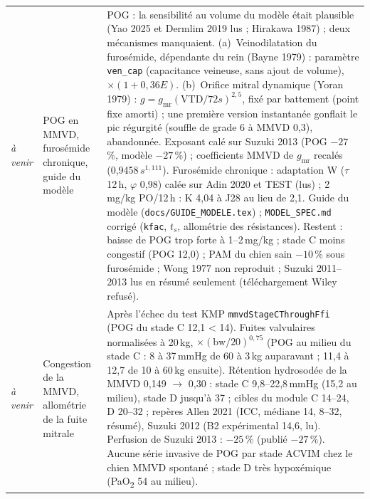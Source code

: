 \documentclass[11pt,a4paper]{article}
\newcommand{\ecart}[1]{\textcolor{red!60!black}{#1}}
\begin{document}
\begin{longtable}{@{}p{1.5cm}p{4.2cm}p{10.3cm}@{}}
\textit{à venir} & POG en MMVD, furosémide chronique, guide du modèle & POG : la sensibilité au volume du modèle était plausible (Yao 2025 et Dermlim 2019 lus ; Hirakawa 1987) ; deux mécanismes manquaient. (a)~Veinodilatation du furosémide, dépendante du rein (Bayne 1979) : paramètre \texttt{ven\_cap} (capacitance veineuse, sans ajout de volume), $\times(1+0{,}36E)$. (b)~Orifice mitral dynamique (Yoran 1979) : $g = g_\mathrm{mr}(\mathrm{VTD}/72s)^{2{,}5}$, fixé par battement (point fixe amorti) ; une première version instantanée gonflait le pic régurgité (souffle de grade 6 à MMVD 0,3), abandonnée. Exposant calé sur Suzuki 2013 (POG $-27$\,\%, modèle $-27$\,\%) ; coefficients MMVD de $g_\mathrm{mr}$ recalés (0,9458\,$s^{1{,}111}$). Furosémide chronique : adaptation W ($\tau$ 12\,h, $\varphi$ 0,98) calée sur Adin 2020 et TEST (lus) ; 2\,mg/kg PO/12\,h : K 4,04 à J28 au lieu de 2,1. Guide du modèle (\texttt{docs/GUIDE\_MODELE.tex}) ; \texttt{MODEL\_SPEC.md} corrigé (\texttt{kfac}, $t_s$, allométrie des résistances). \ecart{Restent : baisse de POG trop forte à 1--2\,mg/kg ; stade C moins congestif (POG 12,0) ; PAM du chien sain $-10$\,\% sous furosémide ; Wong 1977 non reproduit ; Suzuki 2011--2013 lus en résumé seulement (téléchargement Wiley refusé).}\\
\textit{à venir} & Congestion de la MMVD, allométrie de la fuite mitrale & Après l'échec du test KMP \texttt{mmvdStageCThroughFfi} (POG du stade C 12,1 < 14). Fuites valvulaires normalisées à 20\,kg, $\times(\mathrm{bw}/20)^{0{,}75}$ (POG au milieu du stade C : 8 à 37\,mmHg de 60 à 3\,kg auparavant ; 11,4 à 12,7 de 10 à 60\,kg ensuite). Rétention hydrosodée de la MMVD 0,149 $\to$ 0,30 : stade C 9,8--22,8\,mmHg (15,2 au milieu), stade D jusqu'à 37 ; cibles du module C 14--24, D 20--32 ; repères Allen 2021 (ICC, médiane 14, 8--32, résumé), Suzuki 2012 (B2 expérimental 14,6, lu). Perfusion de Suzuki 2013 : $-25$\,\% (publié $-27$\,\%). \ecart{Aucune série invasive de POG par stade ACVIM chez le chien MMVD spontané ; stade D très hypoxémique (PaO\textsubscript{2} 54 au milieu).}\\
\bottomrule
\end{longtable}
\end{document}
